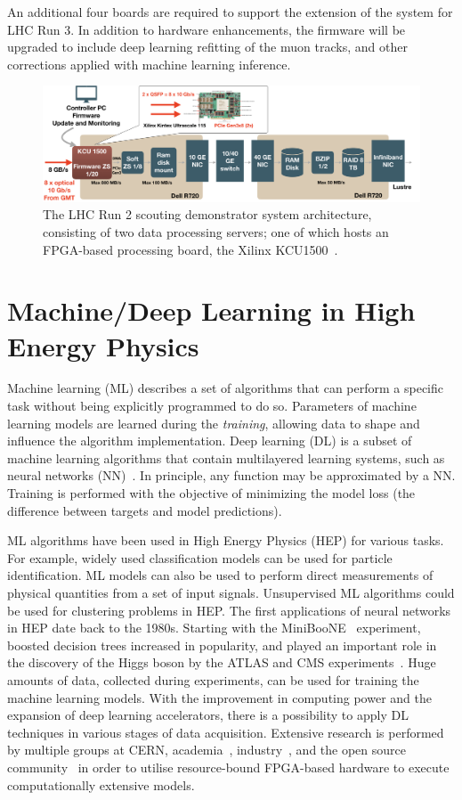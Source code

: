 \documentclass[10pt, paper=a4, UKenglish]{article}
\begin{document}
An additional four boards are required to support the extension of the system for LHC Run 3. In addition to hardware enhancements, the firmware will be upgraded to include deep learning refitting of the muon tracks, and other corrections applied with machine learning inference.

\begin{figure}[!htb]
    \centering
    \captionsetup[subfigure]{labelformat=empty}
    \includegraphics[height=0.2417\linewidth]{./images/scouting_prot_kcu.png}
    \caption{The LHC Run 2 scouting demonstrator system architecture, consisting of two data processing servers; one of which hosts an FPGA-based processing board, the Xilinx KCU1500~\cite{kcu}.}
    \label{fig:scouting_arch}
\end{figure}

\section{Machine/Deep Learning in High Energy Physics}
\label{Machine/Deep Learning in High Energy Physics}

Machine learning (ML) describes a set of algorithms that can perform a specific task without being explicitly programmed to do so. Parameters of machine learning models are learned during the \textit{training}, allowing data to shape and influence the algorithm implementation. Deep learning (DL) is a subset of machine learning algorithms that contain multilayered learning systems, such as neural networks (NN)~\cite{DL}. In principle, any function may be approximated by a NN. Training is performed with the objective of minimizing the model loss (the difference between targets and model predictions).

ML algorithms have been used in High Energy Physics (HEP) for various tasks. For example, widely used classification models can be used for particle identification. ML models can also be used to perform direct measurements of physical quantities from a set of input signals. Unsupervised ML algorithms could be used for clustering problems in HEP. The first applications of neural networks in HEP date back to the 1980s. Starting with the MiniBooNE~\cite{miniboone} experiment, boosted decision trees increased in popularity, and played an important role in the discovery of the Higgs boson by the ATLAS and CMS experiments~\cite{aradovic}. Huge amounts of data, collected during experiments, can be used for training the machine learning models. With the improvement in computing power and the expansion of deep learning accelerators, there is a possibility to apply DL techniques in various stages of data acquisition. Extensive research is performed by multiple groups at CERN, academia~\cite{hls4ml}, industry~\cite{ibm_low_inf}, and the open source community~\cite{qkeras} in order to utilise resource-bound FPGA-based hardware to execute computationally extensive models.
\end{document}
